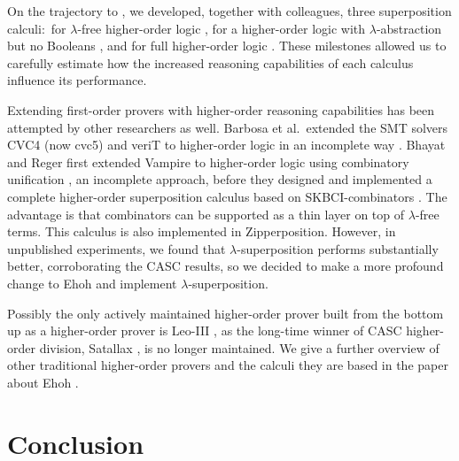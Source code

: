 On the trajectory to \ehohii{}, we developed, together with colleagues, three
superposition calculi:\ for $\lambda$-free higher-order logic
\cite{bbcw-21-lfho}, for a higher-order logic with $\lambda$-abstraction
but no Booleans \cite{bbtvw-21-sup-lam}, and for full higher-order logic
\cite{bbtvw-21-sup-lam}. These milestones allowed us to carefully
estimate how the increased reasoning capabilities of each calculus influence its
performance.

Extending first-order provers with higher-order reasoning capabilities has been
attempted by other researchers as well.
Barbosa et al.\ extended
the SMT solvers CVC4 (now cvc5) and veriT to higher-order logic in an incomplete
way \cite{brotb-19-ho-smt}.
Bhayat and Reger first extended Vampire to
higher-order logic using combinatory unification \cite{br-20-full-sup-w-combs},
an incomplete approach, before they designed and implemented a complete
higher-order superposition calculus based on \textsf{SKBCI}-com\-binators \cite{br-19-comb-unif}.
The advantage is that combinators can be supported as a thin layer on top of
$\lambda$-free terms.
This calculus is also implemented in Zipperposition.
However, in unpublished experiments, we found that $\lambda$-superposition
performs substantially better, corroborating the CASC results, so we decided to
make a more profound change to Ehoh and implement $\lambda$-superposition.

Possibly the only actively maintained higher-order prover built from the bottom
up as a higher-order prover is Leo-III \cite{sb-21-leo3}, as the long-time
winner of CASC higher-order division, Satallax \cite{cb-12-satallax}, is no
longer maintained. We give a further overview of other traditional higher-order
provers and the calculi they are based in the paper about Ehoh
\cite[Sect.~9]{section-ehoh}.

\section{Conclusion} %
\label{sec:ehoh2:conclusion}

